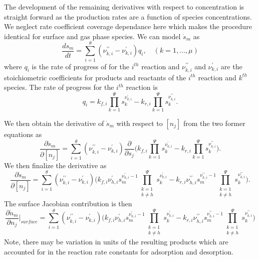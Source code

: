 \documentclass{article}
\def\surfreactions{\theta}
\def\nspecies{\Psi}
\def\surfspecies{\mu}
\begin{document}
The development of the remaining derivatives with respect to concentration is straight forward as the production rates are a function of species concentrations.
We neglect rate coefficient coverage dependance here which makes the procedure identical for surface and gas phase species.
We can model $\dot{s}_{m}$ as
\begin{equation}
        \frac{d s_{m}}{dt} = \sum_{i=1}^{\surfreactions}{(\nu^{\prime\prime}_{k,i}-\nu^{\prime}_{k,i})q_i},\quad(k=1,...,\surfspecies)
\end{equation}
where $q_i$ is the rate of progress of for the $i^{th}$ reaction and $\nu^{\prime\prime}_{k,i}$ and $\nu^{\prime}_{k,i}$ are the stoichiometric coefficients for products and reactants of the $i^{th}$ reaction and $k^{th}$ species.
The rate of progress for the $i^{th}$ reaction is
\begin{equation}
        q_i = k_{f,i}\prod_{k=1}^{\nspecies}{s_k^{\nu^{\prime}_{k,i}}} - k_{r,i}\prod_{k=1}^{\nspecies}{s_k^{\nu^{\prime\prime}_{k,i}}}.
\end{equation}

We then obtain the derivative of $\dot{s}_m$ with respect to $[n_j]$ from the two former equations as
\begin{equation}
        \frac{\partial \dot{s}_{m}}{\partial [n_j]}  = \sum_{i=1}^{\surfreactions}{(\nu^{\prime\prime}_{k,i}-\nu^{\prime}_{k,i})\frac{\partial}{\partial s_j}\bigg(k_{f,i}\prod_{k=1}^{\nspecies}{s_k^{\nu^{\prime}_{k,i}}} - k_{r,i}\prod_{k=1}^{\nspecies}{s_k^{\nu^{\prime\prime}_{k,i}}}\bigg)}.
\end{equation}
We then finalize the derivative as
\begin{equation}
        \frac{\partial \dot{s}_{m}}{\partial [n_j]}  = \sum_{i=1}^{\surfreactions}{(\nu^{\prime\prime}_{k,i}-\nu^{\prime}_{k,i})\bigg(k_{f,i}\nu^\prime_{h,i}s_{m}^{\nu^\prime_{h,i}-1}\prod_{\substack{k = 1 \\ k \neq h}}^{\nspecies}{s_k^{\nu^{\prime}_{k,i}}} - k_{r,i}\nu^{\prime\prime}_{h,i}s_{m}^{\nu^{\prime\prime}_{h,i}-1}\prod_{\substack{k = 1 \\ k \neq h}}^{\nspecies}{s_k^{\nu^{\prime\prime}_{k,i}}}\bigg)}.
\end{equation}
The surface Jacobian contribution is then
\begin{equation}
    \label{surf_contrib}
    \frac{\partial \dot{n}_{m}}{\partial n_j}\Big\vert_{surface} = \sum_{i=1}^{\surfreactions}{(\nu^{\prime\prime}_{k,i}-\nu^{\prime}_{k,i})\bigg(k_{f,i}\nu^\prime_{h,i}s_{m}^{\nu^\prime_{h,i}-1}\prod_{\substack{k = 1 \\ k \neq h}}^{\nspecies}{s_k^{\nu^{\prime}_{k,i}}} - k_{r,i}\nu^{\prime\prime}_{h,i}s_{m}^{\nu^{\prime\prime}_{h,i}-1}\prod_{\substack{k = 1 \\ k \neq h}}^{\nspecies}{s_k^{\nu^{\prime\prime}_{k,i}}}\bigg)}
\end{equation}
Note, there may be variation in units of the resulting products which are accounted for in the reaction rate constants for adsorption and desorption.
\end{document}

